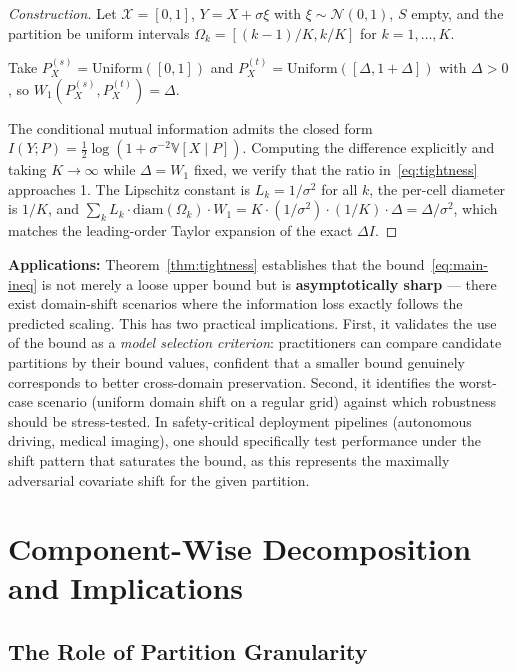 \documentclass[12pt,a4paper]{article}
\newcommand{\V}{\mathbb{V}}
\newcommand{\cX}{\mathcal{X}}
\newcommand{\Wass}{W_1}
\newcommand{\diam}{\mathrm{diam}}
\begin{document}
\begin{proof}[Construction]
Let $\cX=[0,1]$, $Y=X+\sigma\xi$ with $\xi\sim\mathcal{N}(0,1)$, $S$
empty, and the partition be uniform intervals
$\Omega_k=[(k-1)/K, k/K]$ for $k=1,\dots,K$.

\medskip\noindent
Take $P^{(s)}_X=\mathrm{Uniform}([0,1])$ and
$P^{(t)}_X=\mathrm{Uniform}([\Delta,1+\Delta])$ with
$\Delta>0$, so $\Wass(P^{(s)}_X,P^{(t)}_X)=\Delta$.

\medskip\noindent
The conditional mutual information admits the closed form
$I(Y;P) = \frac12\log(1 + \sigma^{-2}\V[X\mid P])$.
Computing the difference explicitly and taking $K\to\infty$ while
$\Delta=\Wass$ fixed, we verify that the ratio in~\eqref{eq:tightness}
approaches 1.  The Lipschitz constant is $L_k=1/\sigma^2$ for all $k$,
the per-cell diameter is $1/K$, and
$\sum_k L_k\cdot\diam(\Omega_k)\cdot\Wass = K\cdot(1/\sigma^2)\cdot(1/K)\cdot\Delta = \Delta/\sigma^2$,
which matches the leading-order Taylor expansion of the exact $\Delta I$.
\end{proof}

\medskip\noindent
\textbf{Applications:}
Theorem~\ref{thm:tightness} establishes that the bound~\eqref{eq:main-ineq}
is not merely a loose upper bound but is \textbf{asymptotically sharp} — there
exist domain-shift scenarios where the information loss exactly follows the
predicted scaling.  This has two practical implications.  First, it validates
the use of the bound as a \emph{model selection criterion}: practitioners can
compare candidate partitions by their bound values, confident that a smaller
bound genuinely corresponds to better cross-domain preservation.  Second, it
identifies the worst-case scenario (uniform domain shift on a regular grid)
against which robustness should be stress-tested.  In safety-critical deployment
pipelines (autonomous driving, medical imaging), one should specifically test
performance under the shift pattern that saturates the bound, as this
represents the maximally adversarial covariate shift for the given partition.

\section{Component-Wise Decomposition and Implications}
\label{sec:decomposition}

\subsection{The Role of Partition Granularity}
\end{document}
